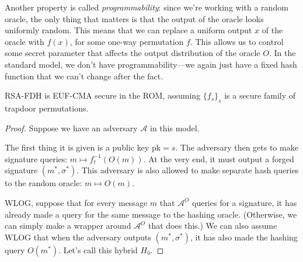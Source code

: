 \documentclass[12pt]{tufte-book}
\begin{document}
Another property is called \emph{programmability}: since we're working with a random oracle, the only thing that matters is that the output of the oracle looks uniformly random. This means that we can replace a uniform output $x$ of the oracle with $f(x)$, for some one-way permutation $f$. This allows us to control some secret parameter that affects the output distribution of the oracle $O$. In the standard model, we don't have programmability---we again just have a fixed hash function that we can't change after the fact.

\begin{theorem}
    RSA-FDH is EUF-CMA secure in the ROM, assuming $\{f_s\}_s$ is a secure family of trapdoor permutations.
\end{theorem}

\begin{proof}
    Suppose we have an adversary $\mathcal{A}$ in this model.

    The first thing it is given is a public key $\mathrm{pk} = s$. The adversary then gets to make signature queries: $m \mapsto f_t^{-1}(O(m))$. At the very end, it must output a forged signature $(m^*, \sigma^*)$. This adversary is also allowed to make separate hash queries to the random oracle: $m \mapsto O(m)$. 

    \begin{center}
    \end{center}

    WLOG, suppose that for every message $m$ that $\mathcal{A}^O$ queries for a signature, it has already made a query for the same message to the hashing oracle. (Otherwise, we can simply make a wrapper around $\mathcal{A}^O$ that does this.) We can also assume WLOG that when the adversary outputs $(m^*, \sigma^*)$, it has also made the hashing query $O(m^*)$. Let's call this hybrid $H_0$.


\end{proof}
\end{document}
